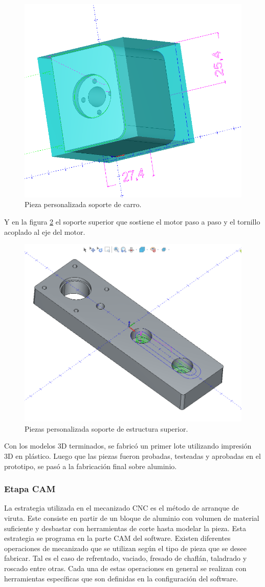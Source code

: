 \begin{figure}[ht]
	\centering
	\includegraphics[width=.5\textwidth]{./Figures/3d_carro.png}
	\caption{Pieza personalizada soporte de carro.}
	\label{fig:carro}
\end{figure}

Y en la figura \ref{fig:estructura_superior} el soporte superior que sostiene el motor paso a paso y el  tornillo acoplado al eje del motor.

\begin{figure}[h]
	\centering
	\includegraphics[width=.5\textwidth]{./Figures/3d_top.png}
	\caption{Piezas personalizada soporte de estructura superior.}
	\label{fig:estructura_superior}
\end{figure}

Con los modelos 3D terminados, se fabricó un primer lote utilizando impresión 3D en plástico.
Luego que las piezas fueron probadas, testeadas y aprobadas en el prototipo, se pasó a la fabricación final sobre aluminio.

\subsubsection{Etapa CAM}

La estrategia utilizada en el mecanizado CNC es el método de arranque de viruta. Este consiste en partir de un bloque de aluminio con volumen de material suficiente y desbastar con herramientas de corte hasta modelar la pieza. Esta estrategia se programa en la parte CAM del software. Existen diferentes operaciones de mecanizado que se utilizan según el tipo de pieza que se desee fabricar. Tal es el caso de refrentado, vaciado, fresado de chaflán, taladrado y roscado entre otras. Cada una de estas operaciones  en general se realizan con herramientas específicas que son definidas en la configuración del software.

